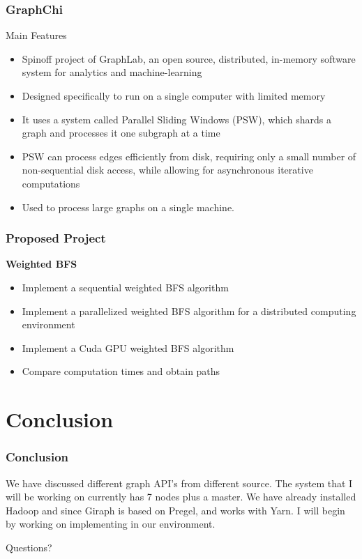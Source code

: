 \documentclass{beamer}
\begin{document}
\begin{frame}
  \frametitle{GraphChi}
  Main Features
	\begin{itemize}
	\item{Spinoff project of GraphLab, an open source, distributed, in-memory software system for analytics and machine-learning}
	\item{Designed specifically to run on a single computer with limited memory}
	\item{It uses a system called Parallel Sliding Windows (PSW), which shards a graph and processes it one subgraph at a time}	
	\item{PSW can process edges efficiently from disk, requiring only a small number of non-sequential disk access, while allowing for asynchronous iterative computations}
	\item{Used to process large graphs on a single machine.}	
	\end{itemize}
\end{frame}

\begin{frame}
  \frametitle{Proposed Project}
  \textbf{Weighted BFS}
  \begin{itemize}
  \item{Implement a sequential weighted BFS algorithm}
  \item{Implement a parallelized weighted BFS algorithm for a distributed computing environment}
  \item{Implement a Cuda GPU weighted BFS algorithm}
  \item{Compare computation times and obtain paths}
  \end{itemize}
\end{frame}
\section{Conclusion}
\begin{frame}
  \frametitle{Conclusion}
  We have discussed different graph API's from different source.  The system that I will be working
  on currently has 7 nodes plus a master. We have already installed Hadoop and since Giraph is based on Pregel,
  and works with Yarn. I will begin by working on implementing in our environment.
\end{frame}
\begin{frame}
  \begin{center}
    Questions?
  \end{center}
  \end{frame}
\end{document}
